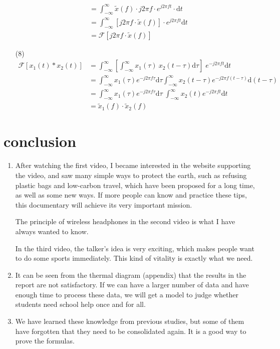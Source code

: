 \documentclass{article}
\begin{document}
\begin{enumerate}
\begin{align*}
        &= \int_{- \infty}^{\infty} \widetilde{x}(f) \cdot j2\pi f \cdot  e^{j2\pi f t} \cdot \mathrm{d}t\\
        &= \int_{- \infty}^{\infty} [j2\pi f \cdot \widetilde{x}(f)] \cdot  e^{j2\pi f t} \mathrm{d}t\\
        &= \mathcal{F} [j2\pi f \cdot \widetilde{x}(f)]
    \end{align*}
    \item[(8)]
    \begin{align*}
        \mathcal{F}[x_1(t)*x_2(t)] &= \int_{- \infty}^{\infty} \left[ \int_{- \infty}^{\infty} x_1(\tau) ~ x_2(t - \tau) \mathrm{d}\tau \right]  \; e^{-j2\pi f t} \mathrm{d}t\\
        &= \int_{- \infty}^{\infty} x_1(\tau) e^{-j2\pi f \tau} \mathrm{d}\tau 
        \int_{- \infty}^{\infty} x_2(t - \tau) e^{-j2\pi f (t - \tau)} \mathrm{d}(t - \tau)\\
        &= \int_{- \infty}^{\infty} x_1(\tau) e^{-j2\pi f \tau} \mathrm{d}\tau \; \int_{- \infty}^{\infty} x_2(t) e^{-j2\pi f t} \mathrm{d}t\\
        &= \widetilde{x}_1(f) \cdot \widetilde{x}_2(f)
    \end{align*}
\end{enumerate}

% 
% 

\section{conclusion}
\begin{enumerate}
    \item 
    After watching the first video, I became interested in the website supporting the video, and saw many simple ways to protect the earth, such as refusing plastic bags and low-carbon travel, which have been proposed for a long time, as well as some new ways. If more people can know and practice these tips, this documentary will achieve its very important mission.
    
    The principle of wireless headphones in the second video is what I have always wanted to know.
    
    In the third video, the talker's idea is very exciting, which makes people want to do some sports immediately. This kind of vitality is exactly what we need.
    \item 
    It can be seen from the thermal diagram (appendix) that the results in the report are not satisfactory. If we can have a larger number of data and have enough time to process these data, we will get a model to judge whether students need school help once and for all.
    \item
    We have learned these knowledge from previous studies, but some of them have forgotten that they need to be consolidated again. It is a good way to prove the formulas.
\end{enumerate}
\end{document}
